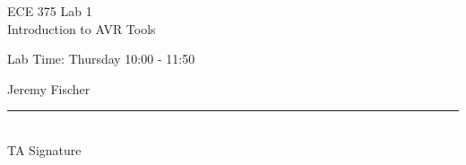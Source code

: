 \documentclass[12pt,letterpaper]{article}
\begin{document}
\begin{titlepage}
    \vspace*{4cm}
    \begin{flushright}
    {\huge
        ECE 375 Lab 1\\[1cm]
    }
    {\large
        Introduction to AVR Tools
    }
    \end{flushright}
    \begin{flushleft}
    Lab Time: Thursday 10:00 - 11:50
    \end{flushleft}
    \begin{flushright}
    Jeremy Fischer
    
    \vfill
    \rule{5in}{.5mm}\\
    TA Signature
    \end{flushright}

\end{titlepage}
\end{document}
